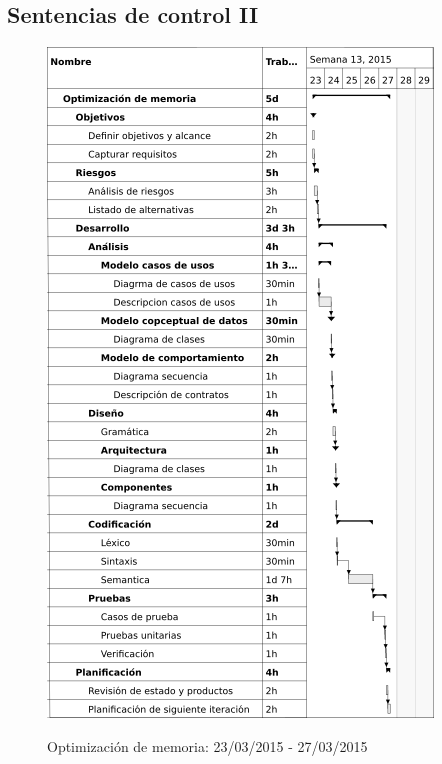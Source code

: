 \subsection{Sentencias de control II}
\begin{center}
\begin{figure}[H]
\centering
\includegraphics[scale=1]{planning/18-optimizacion-memoria.png} \\
\caption{Optimización de memoria: 23/03/2015 - 27/03/2015 }
\end{figure}
\end{center}


